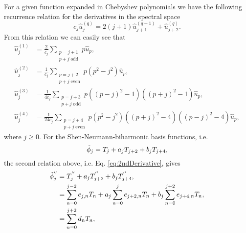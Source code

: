 
For a given function expanded in Chebyshev polynomials we have the following recurrence relation for the derivatives in the spectral space \cite{Canuto2006}
\begin{equation}
c_j\hat{u}_j^{(q)} = 2(j+1)\hat{u}_{j+1}^{(q-1)}  + \hat{u}_{j+2}^{(q)}. 
\end{equation}
From this relation we can easily see that
\begin{align}
\hat{u}_j^{(1)} &= \frac{2}{c_j}\sum_{\substack{p = j+1\\
                  p+j\; \text{odd}}} p \hat{u}_p, \\
\hat{u}_j^{(2)} &= \frac{1}{c_j}\sum_{\substack{p = j+2\\
                  p+j\; \text{even}}} p(p^2-j^2) \hat{u}_p, \label{eq:2ndDerivative}   \\   
\hat{u}_j^{(3)} &= \frac{1}{4 c_j}\sum_{\substack{p = j+3\\
                  p+j\; \text{odd}}} p((p-j)^2-1)((p+j)^2 -1) \hat{u}_p, \\   
\hat{u}_j^{(4)} &= \frac{1}{24 c_j}\sum_{\substack{p = j+4\\
                  p+j\; \text{even}}} p(p^2-j^2)((p+j)^2 -4) ((p-j)^2 -4) \hat{u}_p, \label{eq:4thDerivative}                                               
\end{align}
where $j \geq 0$. 
For the Shen-Neumann-biharmonic basis functions, i.e.
\begin{equation}
\tilde{\phi}_j = T_j + a_j T_{j+2} + b_j T_{j+4}, 
\end{equation}
the second relation above, i.e. Eq. \ref{eq:2ndDerivative}, gives
\begin{align}
\tilde{\phi}^{''}_{j} &= T_j^{''} + a_j T_{j+2}^{''} + b_j T_{j+4}^{''},\nonumber\\
                        &= \sum_{n=0}^{j-2} e_{j,n} T_n + a_j\sum_{n=0}^{j} e_{j+2,n} T_n + b_j\sum_{n=0}^{j+2} e_{j+4, n} T_n, \nonumber\\
                        &= \sum_{n=0}^{j+2} d_{n} T_n, \label{eq:SecondDerivative}
\end{align} 
